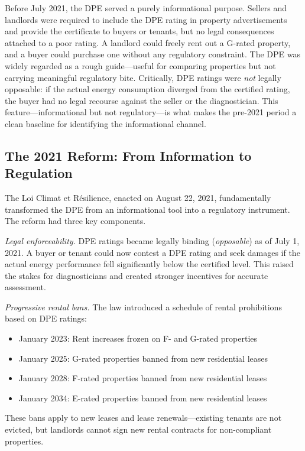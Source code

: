 \documentclass[12pt]{article}
\begin{document}
Before July 2021, the DPE served a purely informational purpose. Sellers and landlords were required to include the DPE rating in property advertisements and provide the certificate to buyers or tenants, but no legal consequences attached to a poor rating. A landlord could freely rent out a G-rated property, and a buyer could purchase one without any regulatory constraint. The DPE was widely regarded as a rough guide---useful for comparing properties but not carrying meaningful regulatory bite. Critically, DPE ratings were \textit{not} legally opposable: if the actual energy consumption diverged from the certified rating, the buyer had no legal recourse against the seller or the diagnostician. This feature---informational but not regulatory---is what makes the pre-2021 period a clean baseline for identifying the informational channel.

\subsection{The 2021 Reform: From Information to Regulation}

The Loi Climat et R\'esilience, enacted on August 22, 2021, fundamentally transformed the DPE from an informational tool into a regulatory instrument. The reform had three key components.

\textit{Legal enforceability.} DPE ratings became legally binding (\textit{opposable}) as of July 1, 2021. A buyer or tenant could now contest a DPE rating and seek damages if the actual energy performance fell significantly below the certified level. This raised the stakes for diagnosticians and created stronger incentives for accurate assessment.

\textit{Progressive rental bans.} The law introduced a schedule of rental prohibitions based on DPE ratings:
\begin{itemize}
    \item January 2023: Rent increases frozen on F- and G-rated properties
    \item January 2025: G-rated properties banned from new residential leases
    \item January 2028: F-rated properties banned from new residential leases
    \item January 2034: E-rated properties banned from new residential leases
\end{itemize}
These bans apply to new leases and lease renewals---existing tenants are not evicted, but landlords cannot sign new rental contracts for non-compliant properties.
\end{document}

